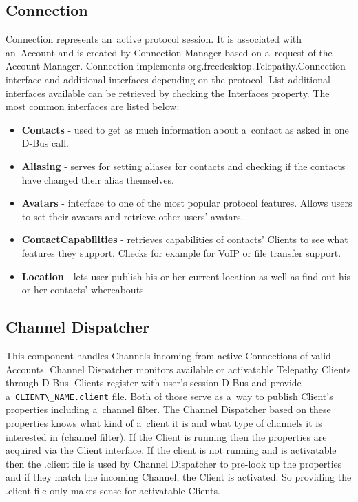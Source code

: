 \subsection*{Connection}
Connection represents an~active protocol session. It is associated with an~Account and is created by Connection Manager based on a~request of the Account Manager. Connection implements org.freedesktop.Telepathy.Connection interface and additional interfaces depending on the protocol. List additional interfaces available can be retrieved by checking the Interfaces property. The most common interfaces are listed below\cite{TPWiki}:

\begin{itemize}

	\item {\bf Contacts} - used to get as much information about a~contact as asked in one D-Bus call.

	\item {\bf Aliasing} - serves for setting aliases for contacts and checking if the contacts have changed their alias themselves. 

	\item {\bf Avatars} - interface to one of the most popular protocol features. Allows users to set their avatars and retrieve other users' avatars.

	\item {\bf ContactCapabilities} - retrieves capabilities of contacts' Clients to see what features they support. Checks for example for VoIP or file transfer support.

	\item {\bf Location} - lets user publish his or her current location as well as find out his or her contacts' whereabouts. 

\end{itemize}


\subsection*{Channel Dispatcher}
This component handles Channels incoming from active Connections of valid Accounts. Channel Dispatcher monitors available or activatable Telepathy Clients through D-Bus. Clients register with user's session D-Bus and provide a~\verb|CLIENT\_NAME.client| file. Both of those serve as a~way to publish Client's properties including a~channel filter. The Channel Dispatcher based on these properties knows what kind of a~client it is and what type of channels it is interested in (channel filter). If the Client is running then the properties are acquired via the Client interface. If the client is not running and is activatable then the .client file is used by Channel Dispatcher to pre-look up the properties and if they match the incoming Channel, the Client is activated. So providing the .client file only makes sense for activatable Clients.  

